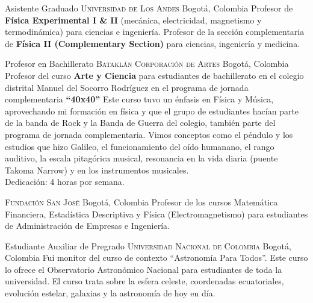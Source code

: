 \documentclass[12pt,letterpaper,sans]{moderncv}
\begin{document}

        {Asistente Graduado}
        {\textsc{Universidad de Los Andes}}
        {Bogot\'a, Colombia}{}
        {Profesor de \textbf{Física Experimental I \& II} (mecánica, electricidad, magnetismo
          y termodinámica) para ciencias e ingeniería. Profesor de la sección complementaria
          de \textbf{Física II (Complementary Section)} para ciencias, ingeniería y medicina.}


        {Profesor en Bachillerato}
        {\textsc{Batakl\'an Corporaci\'on de Artes}}
        {Bogot\'a, Colombia}{}
        {Profesor del curso \textbf{Arte y Ciencia} para estudiantes de bachillerato en el colegio
          distrital Manuel del Socorro Rodríguez en el programa de jornada complementaria \textbf{``40x40''}
          Este curso tuvo un énfasis en Física y Música, aprovechando mi formación en física y que el grupo de
          estudiantes hacían parte de la banda de Rock y la Banda de Guerra del colegio, también parte del
          programa de jornada complementaria.
          Vimos conceptos como el péndulo y los
          estudios que hizo Galileo, el funcionamiento del oído humanano, el rango auditivo, la escala
          pitagórica musical, resonancia en la vida diaria (puente Takoma Narrow) y en los instrumentos
          musicales.
          \\ Dedicación: 4 horas por semana.}

        {\textsc{Fundaci\'on San Jos\'e}}
        {Bogot\'a, Colombia}{}
        {Profesor de los cursos Matemática Financiera, Estadística Descriptiva y Física (Electromagnetismo)
          para estudiantes de Administración de Empresas e Ingeniería.}


        {Estudiante Auxiliar de Pregrado}
        {\textsc{Universidad Nacional de Colombia}}
        {Bogot\'a, Colombia}{}
        {Fui monitor del curso de contexto ``Astronomía Para Todos''. Este curso lo ofrece el Observatorio
          Astronómico Nacional para estudiantes de toda la universidad. El curso trata sobre la esfera
        celeste, coordenadas ecuatoriales, evolución estelar, galaxias y la astronomía de hoy en día.}
\end{document}
